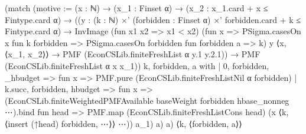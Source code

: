 \documentclass[10pt]{article}
\begin{document}
\begin{ReviewVerbatim}
                              (match (motive :=
                                  (x : ℕ) →
                                    (x_1 : Finset α) →
                                      (x_2 : x_1.card + x ≤ Fintype.card α) →
                                        ((y :
                                              (k : ℕ) ×'
                                                (forbidden : Finset α) ×' forbidden.card + k ≤ Fintype.card α) →
                                            InvImage (fun x1 x2 => x1 < x2)
                                                (fun x =>
                                                  PSigma.casesOn x fun k forbidden =>
                                                    PSigma.casesOn forbidden fun forbidden a => k)
                                                y ⟨x, ⟨x_1, x_2⟩⟩ →
                                              PMF (EconCSLib.finiteFreshList α y.1 y.2.1)) →
                                          PMF (EconCSLib.finiteFreshList α x x_1))
                                  k, forbidden, a with
                                | 0, forbidden, _hbudget => fun x => PMF.pure (EconCSLib.finiteFreshListNil α forbidden)
                                | k.succ, forbidden, hbudget => fun x =>
                                  (EconCSLib.finiteWeightedPMFAvailable baseWeight forbidden hbase_nonneg ⋯).bind
                                    fun head =>
                                    PMF.map (EconCSLib.finiteFreshListCons head)
                                      (x ⟨k, ⟨insert (↑head) forbidden, ⋯⟩⟩ ⋯))
                                a_1)
                            a)
                        a)
                    ⟨k, ⟨forbidden, a⟩⟩
\end{ReviewVerbatim}
\end{document}

